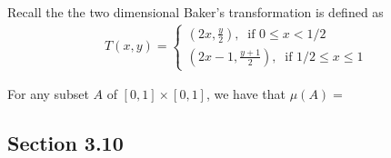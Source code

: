 \documentclass[12pt]{article}
\newenvironment{problem}[2][Problem]{\begin{trivlist}
\item[\hskip \labelsep {\bfseries #1}\hskip \labelsep {\bfseries #2.}]}{\end{trivlist}}
\begin{document}
Recall the the two dimensional Baker's transformation is defined as 
\begin{align*}
T(x, y) = \begin{cases}
(2x, \frac{y}{2}), \ \text{ if } 0 \leq x < 1/2\\
(2x-1, \frac{y+1}{2}), \ \text{ if } 1/2 \leq x \leq 1
\end{cases}
\end{align*}

For any subset $A$ of $[0,1] \times [0,1]$, we have that $\mu(A) = $

\subsection{Section 3.10}

\begin{problem}{1}
\end{problem}

\begin{problem}{3}
\end{problem}

\begin{problem}{4}
\end{problem}

\begin{problem}{6}
\end{problem}
\end{document}
